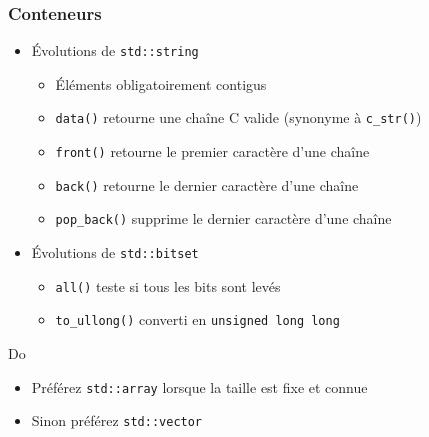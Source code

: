 \documentclass[C++.tex]{subfiles}
\begin{document}
\begin{frame}[fragile]
	\frametitle{Conteneurs}
	\begin{itemize}
		\item Évolutions de \lstinline|std::string|
		\begin{itemize}
			\item Éléments obligatoirement contigus
			\item \lstinline|data()| retourne une chaîne C valide (synonyme à \lstinline|c_str()|)


			\item \lstinline|front()| retourne le premier caractère d'une chaîne
			\item \lstinline|back()| retourne le dernier caractère d'une chaîne
			\item \lstinline|pop_back()| supprime le dernier caractère d'une chaîne
		\end{itemize}
		\item Évolutions de \lstinline|std::bitset|
		\begin{itemize}
			\item \lstinline|all()| teste si tous les bits sont levés
			\item \lstinline|to_ullong()| converti en \lstinline|unsigned long long|
		\end{itemize}
	\end{itemize}

	\begin{exampleblock}{Do}
		\begin{itemize}
			\item Préférez \lstinline|std::array| lorsque la taille est fixe et connue
			\item Sinon préférez \lstinline|std::vector| 
		\end{itemize}
	\end{exampleblock}


\end{frame}
\end{document}
